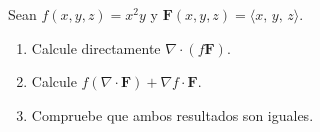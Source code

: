 Sean $f(x,y,z)=x^2y$ y $\mathbf{F}(x,y,z)=\langle x,\,y,\,z\rangle$.
\begin{enumerate}
    \item Calcule directamente $\nabla\cdot(f\mathbf{F})$.
    \item Calcule $f(\nabla\cdot\mathbf{F})+\nabla f\cdot\mathbf{F}$.
    \item Compruebe que ambos resultados son iguales.
\end{enumerate}
